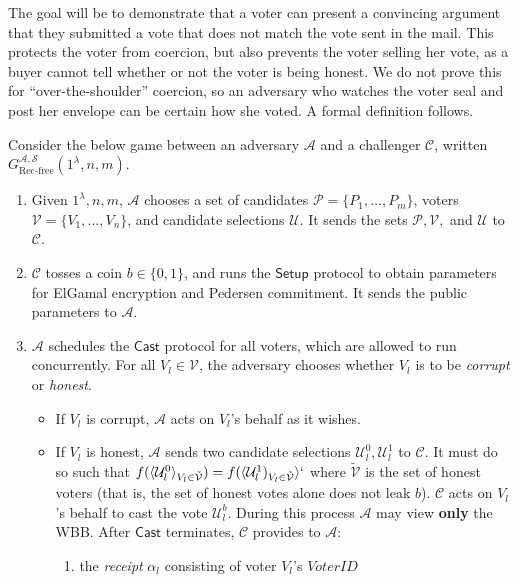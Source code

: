 \documentclass[12pt,a4paper]{article}
\theoremstyle{definition}
\newcommand{\VoterID}{\mathit{VoterID}}
\begin{document}
The goal will be to demonstrate that a voter can present a convincing argument that they submitted a vote that does not match the vote sent in the mail. This protects the voter from coercion, but also prevents the voter selling her vote, as a buyer cannot tell whether or not the voter is being honest. We do not prove this for ``over-the-shoulder'' coercion, so an adversary who watches the voter seal and post her envelope can be certain how she voted. A formal definition follows.
\begin{definition}
    Consider the below game between an adversary $\mathcal{A}$ and a challenger $\mathcal{C}$, written $G_{\text{Rec-free}}^{\mathcal{A},\mathcal{S}}(1^\lambda, n, m)$.
    \begin{enumerate}
        \item Given $1^\lambda, n, m$, $\mathcal{A}$ chooses a set of candidates $\mathcal{P}=\{P_1,\ldots,P_m\}$, voters $\mathcal{V}=\{V_1,\ldots,V_n\}$, and candidate selections $\mathcal{U}$. It sends the sets $\mathcal{P}, \mathcal{V},$ and $\mathcal{U}$ to $\mathcal{C}$.
        \item $\mathcal{C}$ tosses a coin $b\in\{0, 1\}$, and runs the $\mathsf{Setup}$ protocol to obtain parameters for ElGamal encryption and Pedersen commitment. It sends the public parameters to $\mathcal{A}$.
        \item $\mathcal{A}$ schedules the $\mathsf{Cast}$ protocol for all voters, which are allowed to run concurrently. For all $V_l\in\mathcal{V}$, the adversary chooses whether $V_l$ is to be \textit{corrupt} or \textit{honest}.
        \begin{itemize}
            \item If $V_l$ is corrupt, $\mathcal{A}$ acts on $V_l$'s behalf as it wishes.
            \item If $V_l$ is honest, $\mathcal{A}$ sends two candidate selections $\mathcal{U}_l^0, \mathcal{U}_l^1$ to $\mathcal{C}$. It must do so such that $f(\langle\mathcal{U}_l^0\rangle_{V_l\in \tilde{\mathcal{V}}})=f(\langle\mathcal{U}^1_l)_{V_l\in \tilde{\mathcal{V}}}\rangle`$ where $\tilde{\mathcal{V}}$ is the set of honest voters (that is, the set of honest votes alone does not leak $b$). $\mathcal{C}$ acts on $V_l$'s behalf to cast the vote $\mathcal{U}_l^b$. During this process $\mathcal{A}$ may view \textbf{only} the WBB. After $\mathsf{Cast}$ terminates, $\mathcal{C}$ provides to $\mathcal{A}$:
            \begin{enumerate}
                \item the \textit{receipt} $\alpha_l$ consisting of voter $V_l$'s $\VoterID$

\end{enumerate}
\end{itemize}
\end{enumerate}
\end{definition}
\end{document}
